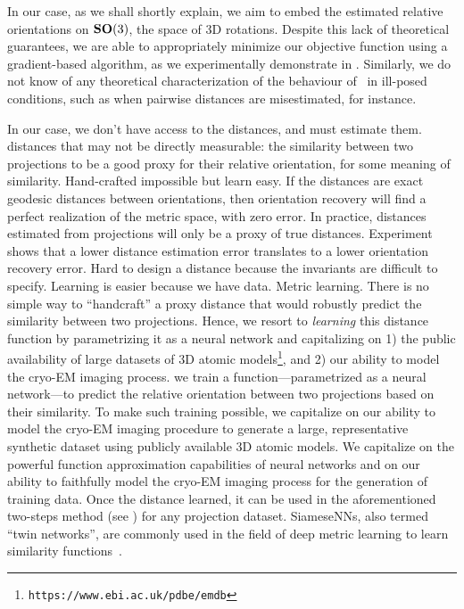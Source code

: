 In our case, as we shall shortly explain, we aim to embed the estimated relative orientations on $\mathrm{\mathbf{SO}}(3)$, the space of 3D rotations.
Despite this lack of theoretical guarantees, we are able to appropriately minimize our objective function using a gradient-based algorithm, as we experimentally demonstrate in .
Similarly, we do not know of any theoretical characterization of the behaviour of~ in ill-posed conditions, such as when pairwise distances are misestimated, for instance.

In our case, we don't have access to the distances, and must estimate them.
distances that may not be directly measurable:
the similarity between two projections to be a good proxy for their relative orientation, for some meaning of similarity.
Hand-crafted impossible but learn easy.
If the distances are exact geodesic distances between orientations, then orientation recovery will find a perfect realization of the metric space, with zero error.
In practice, distances estimated from projections will only be a proxy of true distances.
Experiment  shows that a lower distance estimation error translates to a lower orientation recovery error.
Hard to design a distance because the invariants are difficult to specify. Learning is easier because we have data.
Metric learning.
There is no simple way to ``handcraft'' a proxy distance that would robustly predict the similarity between two projections.
Hence, we resort to \textit{learning} this distance function by parametrizing it as a neural network and capitalizing on 1) the public availability of large datasets of 3D atomic models\footnote{\texttt{https://www.ebi.ac.uk/pdbe/emdb}}, and 2) our ability to model the cryo-EM imaging process.
we train a function---parametrized as a neural network---to predict the relative orientation between two projections based on their similarity.
To make such training possible, we capitalize on our ability to model the cryo-EM imaging procedure to generate a large, representative synthetic dataset using publicly available 3D atomic models.
We capitalize on the powerful function approximation capabilities of neural networks and on our ability to faithfully model the cryo-EM imaging process for the generation of training data.
Once the distance learned, it can be used in the aforementioned two-steps method (see ) for any projection dataset.
SiameseNNs, also termed ``twin networks'', are commonly used in the field of deep metric learning to learn similarity functions~\cite{yi2014deep}.

